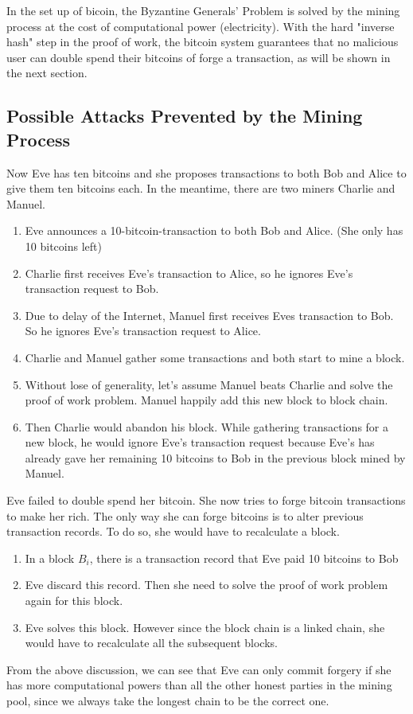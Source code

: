 \documentclass[12pt,a4paper]{article}
\begin{document}
In the set up of bicoin, the Byzantine Generals' Problem is solved by the mining process at the cost of computational power (electricity). With the hard "inverse hash" step in the proof of work, the bitcoin system guarantees that no malicious user can double spend their bitcoins of forge a transaction, as will be shown in the next section.
\subsection{Possible Attacks Prevented by the Mining Process} 
Now Eve has ten bitcoins and she proposes transactions to both Bob and Alice to give them ten bitcoins each. In the meantime, there are two miners Charlie and Manuel.
\begin{enumerate}
	\item Eve announces a 10-bitcoin-transaction to  both Bob and Alice. (She only has 10 bitcoins left)
	\item Charlie first receives Eve's transaction to Alice, so he ignores Eve's transaction request to Bob.
	\item Due to delay of the Internet, Manuel first receives Eves transaction to Bob. So he ignores Eve's transaction request to Alice.
	\item Charlie and Manuel gather some transactions and both start to mine a block. 
	\item Without lose of generality, let's assume Manuel beats Charlie and solve the proof of work problem. Manuel happily add this new block to block chain. 
	\item Then Charlie would abandon his block. While gathering transactions for a new block, he would ignore Eve's transaction request because Eve's has already gave her remaining 10 bitcoins to Bob in the previous block mined by Manuel. 
\end{enumerate}

Eve failed to double spend her bitcoin. She now tries to forge bitcoin transactions to make her rich. The only way she can forge bitcoins is to alter previous transaction records. To do so, she would have to recalculate a block.
\begin{enumerate}
	\item In a block $B_i$, there is a transaction record that Eve paid 10 bitcoins to Bob
	\item Eve discard this record. Then she need to solve the proof of work problem again for this block.
	\item Eve solves this block. However since the block chain is a linked chain, she would have to recalculate all the subsequent blocks. 
\end{enumerate}
From the above discussion, we can see that Eve can only commit forgery if she has more computational powers than all the other honest parties in the mining pool, since we always take the longest chain to be the correct one.
\end{document}
